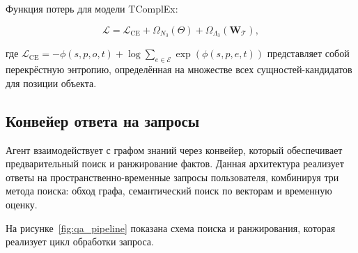 Функция потерь для модели TComplEx:

\begin{equation}
    \mathcal{L} = \mathcal{L}_{\text{CE}} + \Omega_{N_3}(\Theta) + \Omega_{\Lambda_3}(\mathbf{W}_\mathcal{T}),
    \label{eq:total_loss}
\end{equation}

где $\displaystyle \mathcal{L}_{\text{CE}} = -\phi(s,p,o,t) + \log \sum_{e \in \mathcal{E}} \exp(\phi(s,p,e,t))$ представляет собой перекрёстную энтропию, определённая на множестве всех сущностей-кандидатов для позиции объекта.


\subsection{Конвейер ответа на запросы}
\label{sec:qa_pipeline}

Агент взаимодействует с графом знаний через конвейер, который обеспечивает предварительный поиск и ранжирование фактов. Данная архитектура реализует ответы на пространственно-временные запросы пользователя, комбинируя три метода поиска: обход графа, семантический поиск по векторам и временную оценку.  

На рисунке~\ref{fig:qa_pipeline} показана схема поиска и ранжирования, которая реализует цикл обработки запроса.

